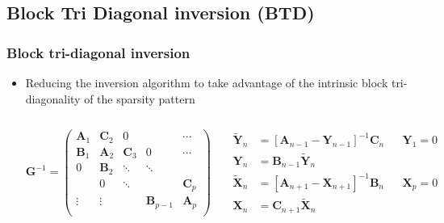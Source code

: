 \subsection{Block Tri Diagonal inversion (BTD)}

\begin{frame}
  \frametitle{Block tri-diagonal inversion}

  \begin{itemize}
    \item
    Reducing the inversion algorithm to take advantage of the intrinsic block tri-diagonality of
    the sparsity pattern

    \begin{columns}[c]


      \begin{equation*}
        \mathbf G^{-1}=
        \begin{pmatrix}
          \bm A_1 & \bm C_2 & 0 & &\cdots \\
          \bm B_1 & \bm A_2 & \bm C_3 & 0& \cdots \\
          0 & \bm B_2 &\ddots & \ddots \\
          & 0  & \ddots & & \bm C_p \\
          \vdots & \vdots  &   & \bm B_{p-1} & \bm A_p\\
        \end{pmatrix}
      \end{equation*}


      \begin{align*}
        \widetilde{\mathbf Y}_n&=\left[\mathbf A_{n-1}-\mathbf Y_{n-1}\right]^{-1}
        \mathbf C_n %
        & & \mathbf Y_1=0
        \\
        \mathbf Y_n&=\mathbf B_{n-1}\widetilde{\mathbf Y}_n
        \\
        \widetilde{\mathbf X}_n & =\left[\mathbf A_{n+1}-\mathbf X_{n+1}\right]^{-1}
        \mathbf B_n %
        & & \mathbf X_p=0
        \\
        \mathbf X_n & =\mathbf C_{n+1}\widetilde{\mathbf X}_n
      \end{align*}

    \end{columns}


\end{itemize}
\end{frame}
